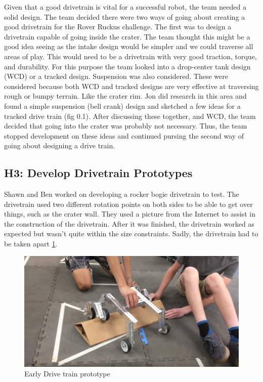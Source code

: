 \documentclass{article}
\begin{document}
Given that a good drivetrain is vital for a successful robot, the team needed a solid design. The team decided there were two ways of going about creating a good drivetrain for the Rover Ruckus challenge. The first was to design a drivetrain capable of going inside the crater. The team thought this might be a good idea seeing as the intake design would be simpler and we could traverse all areas of play. This would need to be a drivetrain with very good traction, torque, and durability. For this purpose the team looked into a drop-center tank design (WCD) or a tracked design. Suspension was also considered. These were considered because both WCD and tracked designs are very effective at traversing rough or bumpy terrain. Like the crater rim. Jon did research in this area and found a simple suspension (bell crank) design and sketched a few ideas for a tracked drive train (fig 0.1). After discussing these together, and WCD, the team decided that going into the crater was probably not necessary. Thus, the team stopped development on these ideas and continued pursing the second way of going about designing a drive train.

\subsection{H3: Develop Drivetrain Prototypes}

Shawn and Ben worked on developing a rocker bogie drivetrain to test. The drivetrain used two different rotation points on both sides to be able to get over things, such as the crater wall. They used a picture from the Internet to assist in the construction of the drivetrain. After it was finished, the drivetrain worked as expected but wasn't quite within the size constraints. Sadly, the drivetrain had to be taken apart \ref{fig:Drive-Train}. 

\begin{figure}
    \centering
    \includegraphics[width=.6\textwidth]{02_09-10/images/Screenshot.png}
    \caption{Early Drive train prototype}
    \label{fig:Drive-Train}
\end{figure}
\end{document}
